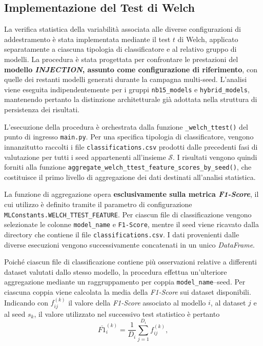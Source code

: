 \subsection{Implementazione del Test di Welch}
\label{subsec:implementazione_welch}

La verifica statistica della variabilità associata alle diverse configurazioni di addestramento è stata implementata mediante il test $t$ di Welch, applicato separatamente a ciascuna tipologia di classificatore e al relativo gruppo di modelli. 
La procedura è stata progettata per confrontare le prestazioni del \textbf{modello \textit{INJECTION}, assunto come configurazione di riferimento}, con quelle dei restanti modelli generati durante la campagna multi-seed. 
L'analisi viene eseguita indipendentemente per i gruppi \texttt{nb15\_models} e \texttt{hybrid\_models}, mantenendo pertanto la distinzione architetturale già adottata nella struttura di persistenza dei risultati.

L'esecuzione della procedura è orchestrata dalla funzione \texttt{\_welch\_ttest()} del punto di ingresso \texttt{main.py}. 
Per una specifica tipologia di classificatore, vengono innanzitutto raccolti i file \texttt{classifications.csv} prodotti dalle precedenti fasi di valutazione per tutti i seed appartenenti all'insieme $\mathcal{S}$. 
I risultati vengono quindi forniti alla funzione \newline \texttt{aggregate\_welch\_ttest\_feature\_scores\_by\_seed()}, che costituisce il primo livello di aggregazione dei dati destinati all'analisi statistica.

La funzione di aggregazione opera \textbf{esclusivamente sulla metrica \textit{F1-Score}}, il cui utilizzo è definito tramite il parametro di configurazione \texttt{MLConstants.WELCH\_TTEST\_FEATURE}. 
Per ciascun file di classificazione vengono selezionate le colonne \texttt{model\_name} e \texttt{F1-Score}, mentre il seed viene ricavato dalla directory che contiene il file \texttt{classifications.csv}. 
I dati provenienti dalle diverse esecuzioni vengono successivamente concatenati in un unico \textit{DataFrame}.

Poiché ciascun file di classificazione contiene più osservazioni relative a differenti dataset valutati dallo stesso modello, la procedura effettua un'ulteriore aggregazione mediante un raggruppamento per coppia \texttt{model\_name}--seed. 
Per ciascuna coppia viene calcolata la media della \textit{F1-Score} sui dataset disponibili. Indicando con $f_{ij}^{(k)}$ il valore della \textit{F1-Score} associato al modello $i$, al dataset $j$ e al seed $s_k$, il valore utilizzato nel successivo test statistico è pertanto
\begin{equation}
\overline{F1}_{i}^{(k)}
=
\frac{1}{D_i}
\sum_{j=1}^{D_i}
f_{ij}^{(k)},
\label{eq:f1_seed_mean_welch}
\end{equation}

